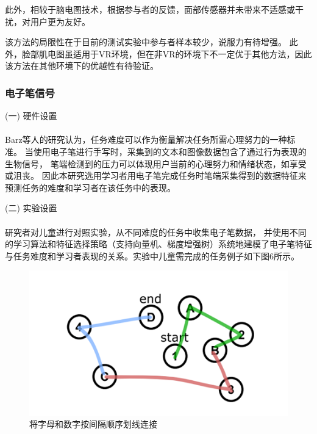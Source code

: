 \documentclass[12pt]{article}
\begin{document}
            此外，相较于脑电图技术，根据参与者的反馈，面部传感器并未带来不适感或干扰，对用户更为友好。

            该方法的局限性在于目前的测试实验中参与者样本较少，说服力有待增强。
            此外，脸部肌电图虽适用于VR环境，但在非VR的环境下不一定优于其他方法，因此该方法在其他环境下的优越性有待验证。

            \subsubsection{电子笔信号}
            (一) 硬件设置\paragraph{}
            Barz等人\cite{ref11}的研究认为，任务难度可以作为衡量解决任务所需心理努力的一种标准。
            当使用电子笔进行手写时，采集到的文本和图像数据包含了通过行为表现的生物信号，
            笔端检测到的压力可以体现用户当前的心理努力和情绪状态，如享受或沮丧。
            因此本研究选用学习者用电子笔完成任务时笔端采集得到的数据特征来预测任务的难度和学习者在该任务中的表现。

            (二) 实验设置\paragraph{}
            研究者对儿童进行对照实验，从不同难度的任务中收集电子笔数据，
            并使用不同的学习算法和特征选择策略（支持向量机、梯度增强树）系统地建模了电子笔特征与任务难度和学习者表现的关系。实验中儿童需完成的任务例子如下图6所示。

            \begin{figure}[H]
            	
            	\centering
            	\includegraphics[scale=0.5]{images/digital_pen.png}
            	\caption{将字母和数字按间隔顺序划线连接}
            	\label{fig:label}
            \end{figure}
\end{document}
